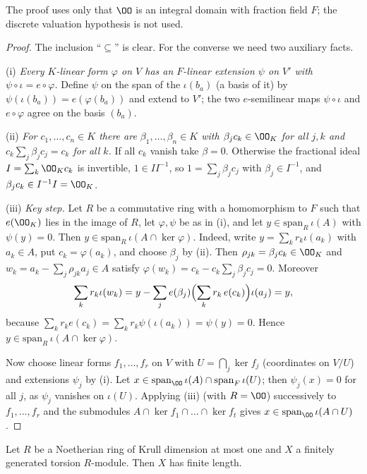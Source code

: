 \begin{remark}
The proof uses only that $\OO$ is an integral domain with fraction field $F$; the discrete valuation
hypothesis is not used.
\end{remark}

\begin{proof}
The inclusion ``$\subseteq$'' is clear. For the converse we need two auxiliary facts.

(i) \emph{Every $K$-linear form $\varphi$ on $V$ has an $F$-linear extension $\psi$ on $V'$ with
$\psi\circ\iota=e\circ\varphi$.} Define $\psi$ on the span of the $\iota(b_a)$ (a basis of it) by
$\psi(\iota(b_a))=e(\varphi(b_a))$ and extend to $V'$; the two $e$-semilinear maps $\psi\circ\iota$ and $e\circ\varphi$
agree on the basis $(b_a)$.

(ii) \emph{For $c_1,\dots,c_n\in K$ there are $\beta_1,\dots,\beta_n\in K$ with $\beta_jc_k\in\OO_K$ for all $j,k$ and
$c_k\sum_j\beta_jc_j=c_k$ for all $k$.} If all $c_k$ vanish take $\beta=0$. Otherwise the fractional ideal
$I=\sum_k\OO_Kc_k$ is invertible, $1\in II^{-1}$, so $1=\sum_j\beta_jc_j$ with $\beta_j\in I^{-1}$, and $\beta_jc_k\in I^{-1}I=\OO_K$.

(iii) \emph{Key step.} Let $R$ be a commutative ring with a homomorphism to $F$ such that $e(\OO_K)$ lies in the
image of $R$, let $\varphi,\psi$ be as in (i), and let $y\in\mathrm{span}_R\,\iota(A)$ with $\psi(y)=0$. Then
$y\in\mathrm{span}_R\,\iota(A\cap\ker\varphi)$. Indeed, write $y=\sum_kr_k\iota(a_k)$ with $a_k\in A$, put $c_k=\varphi(a_k)$, and
choose $\beta_j$ by (ii). Then $\rho_{jk}=\beta_jc_k\in\OO_K$ and $w_k=a_k-\sum_j\rho_{jk}a_j\in A$ satisfy
$\varphi(w_k)=c_k-c_k\sum_j\beta_jc_j=0$. Moreover
\[
  \sum_kr_k\iota(w_k)=y-\sum_j e(\beta_j)\Bigl(\sum_kr_k\,e(c_k)\Bigr)\iota(a_j)=y,
\]
because $\sum_kr_ke(c_k)=\sum_kr_k\psi(\iota(a_k))=\psi(y)=0$. Hence $y\in\mathrm{span}_R\,\iota(A\cap\ker\varphi)$.

Now choose linear forms $f_1,\dots,f_r$ on $V$ with $U=\bigcap_j\ker f_j$ (coordinates on $V/U$) and extensions
$\psi_j$ by (i). Let $x\in\mathrm{span}_\OO\,\iota(A)\cap\mathrm{span}_F\,\iota(U)$; then $\psi_j(x)=0$ for all $j$, as
$\psi_j$ vanishes on $\iota(U)$. Applying (iii) (with $R=\OO$) successively to $f_1,\dots,f_r$ and the submodules
$A\cap\ker f_1\cap\dots\cap\ker f_{t}$ gives $x\in\mathrm{span}_\OO\,\iota(A\cap U)$.
\end{proof}

\begin{lemma}\label{pf:baselat2:finlen}
Let $R$ be a Noetherian ring of Krull dimension at most one and $X$ a finitely generated torsion $R$-module.
Then $X$ has finite length.
\end{lemma}

